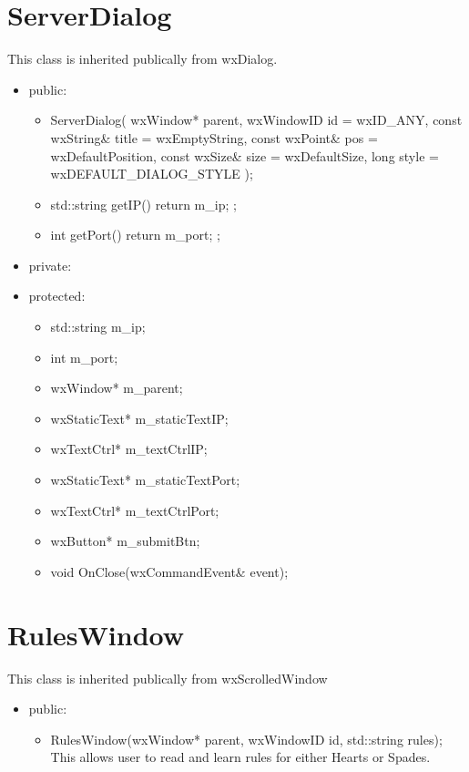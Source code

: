\documentclass[]{scrartcl}
\begin{document}
\section{ServerDialog }
	This class is inherited publically from wxDialog.
	\begin{itemize}
	\item public:

	\begin{itemize}
		\item ServerDialog( wxWindow* parent, wxWindowID id = wxID\_ANY, const wxString\& title = wxEmptyString, const wxPoint\& pos = wxDefaultPosition, const wxSize\& size = wxDefaultSize, long style = wxDEFAULT\_DIALOG\_STYLE );

		\item std::string getIP() { return m\_ip; };

		\item int getPort() { return m\_port; };
	\end{itemize}

	\item private:
	\item protected:
		\begin{itemize}
			\item std::string m\_ip;
			\item	int m\_port;
			\item	wxWindow* m\_parent;
			\item	wxStaticText* m\_staticTextIP;
			\item	wxTextCtrl* m\_textCtrlIP;
			\item	wxStaticText* m\_staticTextPort;
			\item	wxTextCtrl* m\_textCtrlPort;
			\item	wxButton* m\_submitBtn;
			\item	void OnClose(wxCommandEvent\& event);
		\end{itemize}
	\end{itemize}

\section{RulesWindow }
	This class is inherited  publically from wxScrolledWindow

	\begin{itemize}
		\item 	public:
		\begin{itemize}
			\item RulesWindow(wxWindow* parent, wxWindowID id, std::string rules);
				\\This allows user to read and learn rules for either Hearts or Spades.
		\end{itemize}
	\end{itemize}
\end{document}
